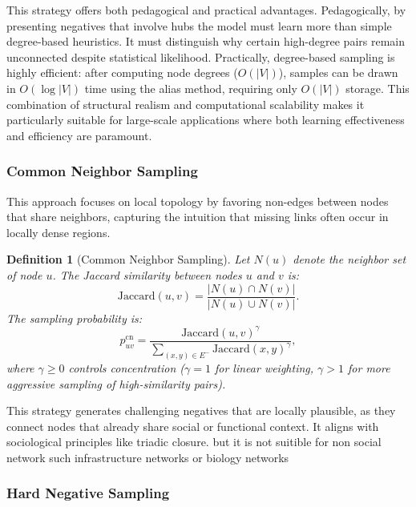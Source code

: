 \documentclass[pdflatex,sn-mathphys-num]{sn-jnl}%
\theoremstyle{thmstyleone}%
\theoremstyle{thmstyletwo}%
\theoremstyle{thmstylethree}%
\newtheorem{definition}{Definition}%
\theoremstyle{plain} %
\theoremstyle{definition} %
\theoremstyle{remark} %
\theoremstyle{plain} %
\begin{document}
This strategy offers both pedagogical and practical advantages. 
Pedagogically, by presenting negatives that involve hubs the model must learn more than simple degree-based heuristics.
It must distinguish why certain high-degree pairs remain unconnected despite statistical likelihood. 
Practically, degree-based sampling is highly efficient: after computing node degrees ($O(|V|)$), samples can be drawn in $O(\log |V|)$ time using the alias method, requiring only $O(|V|)$ storage. 
This combination of structural realism and computational scalability makes it particularly suitable for large-scale applications where both learning effectiveness and efficiency are paramount.

\subsubsection{Common Neighbor Sampling}

This approach focuses on local topology by favoring non-edges between nodes that share neighbors, capturing the intuition that missing links often occur in locally dense regions.

\begin{definition}[Common Neighbor Sampling]
Let $N(u)$ denote the neighbor set of node $u$. The Jaccard similarity between nodes $u$ and $v$ is:
\begin{equation}
\text{Jaccard}(u,v) = \frac{|N(u) \cap N(v)|}{|N(u) \cup N(v)|}.
\end{equation}
The sampling probability is:
\begin{equation}
p_{uv}^{\text{cn}} = \frac{\text{Jaccard}(u,v)^\gamma}{\sum_{(x,y) \in E^-} \text{Jaccard}(x,y)^\gamma},
\end{equation}
where $\gamma \geq 0$ controls concentration ($\gamma=1$ for linear weighting, $\gamma>1$ for more aggressive sampling of high-similarity pairs).
\end{definition}


This strategy generates challenging negatives that are locally plausible, as they connect nodes that already share social or functional context. It aligns with sociological principles like triadic closure.
but it is not suitible for non social network such infrastructure networks or biology networks

\subsubsection{Hard Negative Sampling}
\end{document}
